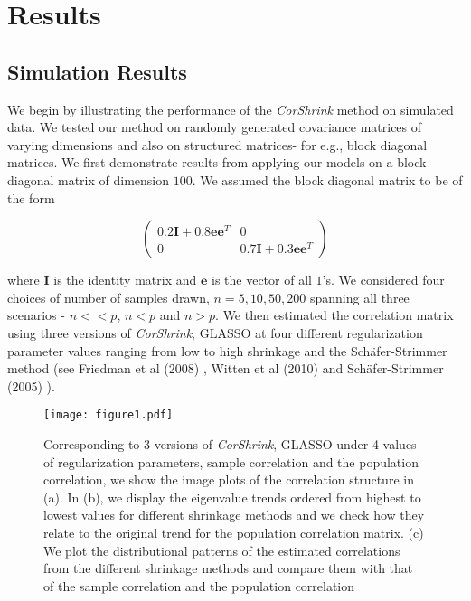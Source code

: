 
\section{Results}

\subsection{Simulation Results}

We begin by illustrating the performance of the \textit{CorShrink} method on simulated data. We tested our method on randomly generated covariance matrices of varying dimensions and also on structured matrices- for e.g., block diagonal matrices. We first demonstrate results from applying our models on a block diagonal matrix of dimension $100$. We assumed the block diagonal matrix to be of the form 

\begin{equation}
\begin{pmatrix}
0.2 \mathbf{I} + 0.8 \mathbf{e} \mathbf{e}^{T}   &             0  \\
  0                             &     0.7 \mathbf{I} + 0.3 \mathbf{e}  \mathbf{e}^{T} 
\end{pmatrix}
\end{equation}
 
where $\mathbf{I}$ is the identity matrix and $\mathbf{e}$ is the vector of all $1$'s. We considered four choices of number of samples drawn, $n = 5, 10, 50, 200$ spanning all three scenarios -  $n << p$, $n <p$ and $ n > p$.  We then estimated the correlation matrix using three versions of \textit{CorShrink}, GLASSO at four different regularization parameter values ranging from low to high shrinkage and the Sch\"{a}fer-Strimmer method (see Friedman et al (2008) \cite{Friedman2008}, Witten et al (2010) \cite{Witten2010} and Sch\"{a}fer-Strimmer (2005) \cite{Schafer2005}). 

\begin{figure*}[ht]
\raggedleft
\texttt{[image: figure1.pdf]}
 \caption{\small{Corresponding to 3 versions of \textit{CorShrink}, GLASSO under 4 values of regularization parameters, sample correlation and the population correlation, we show the image plots of the correlation structure in (a). In (b), we display the eigenvalue trends ordered from highest to lowest values for different shrinkage methods and we check how they relate to the original trend for the population correlation matrix. (c) We plot the distributional patterns of the estimated correlations from the different shrinkage methods and compare them with that of the sample correlation and the population correlation}}
\label{fig:fig1}
\end{figure*}


